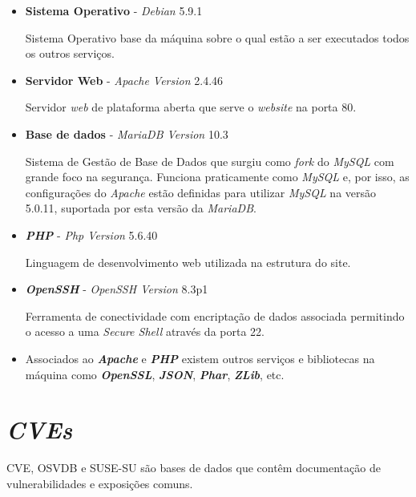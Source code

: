 \documentclass[10pt,english]{article}
\begin{document}
 \begin{itemize}
    \item {\textbf{Sistema Operativo}} - \textit{Debian} 5.9.1 
    \par Sistema Operativo base da máquina sobre o qual estão a ser executados todos os outros serviços.
   
   \item {\textbf{Servidor Web}}   - \textit{Apache Version} 2.4.46
   \par Servidor \textit{web} de plataforma aberta que serve o \textit{website} na porta 80.
  
    \item {\textbf{Base de dados}}  - \textit{MariaDB Version} 10.3
    \par Sistema de Gestão de Base de Dados que surgiu como \textit{fork} do \textit{MySQL} com grande foco na segurança. Funciona praticamente como \textit{MySQL} e, por isso, as configurações do \textit{Apache} estão definidas para utilizar \textit{MySQL} na versão 5.0.11, suportada por esta versão da \textit{MariaDB}.

   
   \item {\textbf{\textit{PHP}}}  - \textit{Php Version} 5.6.40
   
   \par Linguagem de desenvolvimento web utilizada na estrutura do site.
   
   \item {\textbf{\textit{OpenSSH}}}  - \textit{OpenSSH Version} 8.3p1 
   \par Ferramenta de conectividade com encriptação de dados associada permitindo o acesso a uma \textit{Secure Shell} através da porta 22.
   
   
   
    \item Associados ao \textit{\textbf{Apache}} e \textit{\textbf{PHP}} existem outros serviços e bibliotecas na máquina como {\textbf{\textit{OpenSSL}}}, {\textbf{\textit{JSON}}}, {\textbf{\textit{Phar}}}, {\textbf{\textit{ZLib}}}, etc.
    
 \end{itemize}
 
 \clearpage

\section{\textit{CVEs}}

\par CVE, OSVDB e SUSE-SU são bases de dados que contêm documentação de vulnerabilidades e exposições comuns. 
\end{document}
